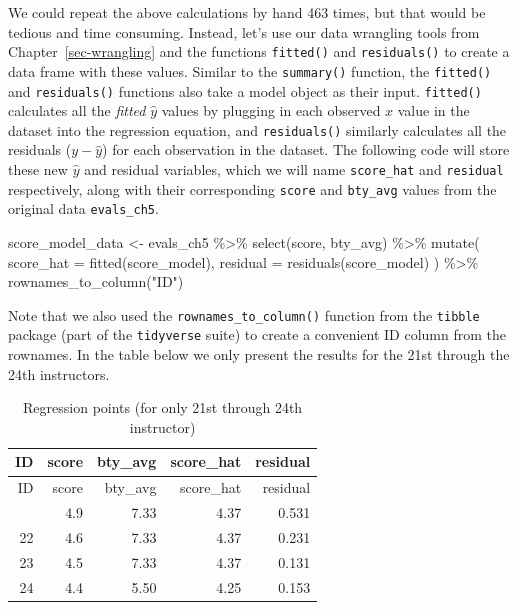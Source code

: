 \documentclass[
  letterpaper,
  DIV=11,
  numbers=noendperiod]{scrreprt}
\newenvironment{Shaded}{\begin{snugshade}}{\end{snugshade}}
\newcommand{\AttributeTok}[1]{\textcolor[rgb]{0.40,0.45,0.13}{#1}}
\newcommand{\FunctionTok}[1]{\textcolor[rgb]{0.28,0.35,0.67}{#1}}
\newcommand{\NormalTok}[1]{\textcolor[rgb]{0.00,0.23,0.31}{#1}}
\newcommand{\OtherTok}[1]{\textcolor[rgb]{0.00,0.23,0.31}{#1}}
\newcommand{\SpecialCharTok}[1]{\textcolor[rgb]{0.37,0.37,0.37}{#1}}
\newcommand{\StringTok}[1]{\textcolor[rgb]{0.13,0.47,0.30}{#1}}
\theoremstyle{definition}
\theoremstyle{remark}
\begin{document}
We could repeat the above calculations by hand 463 times, but that would
be tedious and time consuming. Instead, let's use our data wrangling
tools from Chapter~\ref{sec-wrangling} and the functions
\texttt{fitted()} and \texttt{residuals()} to create a data frame with
these values. Similar to the \texttt{summary()} function, the
\texttt{fitted()} and \texttt{residuals()} functions also take a model
object as their input. \texttt{fitted()} calculates all the
\emph{fitted} \(\hat{y}\) values by plugging in each observed \(x\)
value in the dataset into the regression equation, and
\texttt{residuals()} similarly calculates all the residuals
(\(y - \hat{y}\)) for each observation in the dataset. The following
code will store these new \(\hat{y}\) and residual variables, which we
will name \texttt{score\_hat} and \texttt{residual} respectively, along
with their corresponding \texttt{score} and \texttt{bty\_avg} values
from the original data \texttt{evals\_ch5}.

\begin{Shaded}
\begin{Highlighting}[]
\NormalTok{score\_model\_data }\OtherTok{\textless{}{-}}\NormalTok{ evals\_ch5 }\SpecialCharTok{\%\textgreater{}\%} 
  \FunctionTok{select}\NormalTok{(score, bty\_avg) }\SpecialCharTok{\%\textgreater{}\%} 
  \FunctionTok{mutate}\NormalTok{(}
    \AttributeTok{score\_hat =} \FunctionTok{fitted}\NormalTok{(score\_model),}
    \AttributeTok{residual =} \FunctionTok{residuals}\NormalTok{(score\_model)}
\NormalTok{    ) }\SpecialCharTok{\%\textgreater{}\%} 
  \FunctionTok{rownames\_to\_column}\NormalTok{(}\StringTok{"ID"}\NormalTok{)}
\end{Highlighting}
\end{Shaded}

Note that we also used the \texttt{rownames\_to\_column()} function from
the \texttt{tibble} package (part of the \texttt{tidyverse} suite) to
create a convenient ID column from the rownames. In the table below we
only present the results for the 21st through the 24th instructors.

\hypertarget{tbl-reg-points}{}
\begin{longtable}[]{@{}rrrrr@{}}
\caption{\label{tbl-reg-points}Regression points (for only 21st through
24th instructor)}\tabularnewline
\toprule\noalign{}
ID & score & bty\_avg & score\_hat & residual \\
\midrule\noalign{}
\endfirsthead
\toprule\noalign{}
ID & score & bty\_avg & score\_hat & residual \\
\midrule\noalign{}
\endhead
\bottomrule\noalign{}
\endlastfoot
21 & 4.9 & 7.33 & 4.37 & 0.531 \\
22 & 4.6 & 7.33 & 4.37 & 0.231 \\
23 & 4.5 & 7.33 & 4.37 & 0.131 \\
24 & 4.4 & 5.50 & 4.25 & 0.153 \\
\end{longtable}
\end{document}
